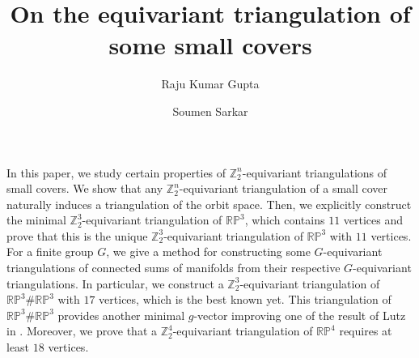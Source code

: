 \documentclass[11pt]{amsart}
\numberwithin{equation}{section}
\theoremstyle{definition}
\def \bb{\mathbb}
\def \ZZ{{\bb{Z}}}
\begin{document}
\title[On the equivariant triangulation of some small covers]{On the equivariant triangulation of some small covers}

\author[R. K. Gupta]{Raju Kumar Gupta}



\address{Department of Mathematics, Indian Institute of Technology Madras, Chennai-600036, India.}

\author[S. Sarkar]{Soumen Sarkar}

\address{Department of Mathematics, Indian Institute of Technology Madras, Chennai-600036, India.}





\abstract In this paper, we study certain properties of $\mathbb{Z}_2^n$-equivariant triangulations of small covers.  We show that any $\mathbb{Z}_2^n$-equivariant triangulation of a small cover  naturally induces a triangulation of the orbit space. Then, we explicitly construct the minimal $\mathbb{Z}_2^3$-equivariant triangulation of $\mathbb{RP}^3$, which contains $11$ vertices and prove that this is the unique $\mathbb{Z}_2^3$-equivariant triangulation of $\mathbb{RP}^3$ with $11$ vertices. For a finite group $G$, we give a method for constructing some $G$-equivariant triangulations of connected sums of manifolds from their respective $G$-equivariant triangulations. In particular, we construct a $\mathbb{Z}_2^3$-equivariant triangulation of $\mathbb{RP}^3 \# \mathbb{RP}^3$ with $17$ vertices, which is the best known yet. This triangulation of $\mathbb{RP}^3 \# \mathbb{RP}^3$ provides another minimal $g$-vector improving one of the result of Lutz in \cite{LS}. Moreover, we prove that a $\ZZ_2^4$-equivariant triangulation of $\mathbb{RP}^4$ requires at least $18$ vertices. 

\endabstract

\maketitle
\end{document}
